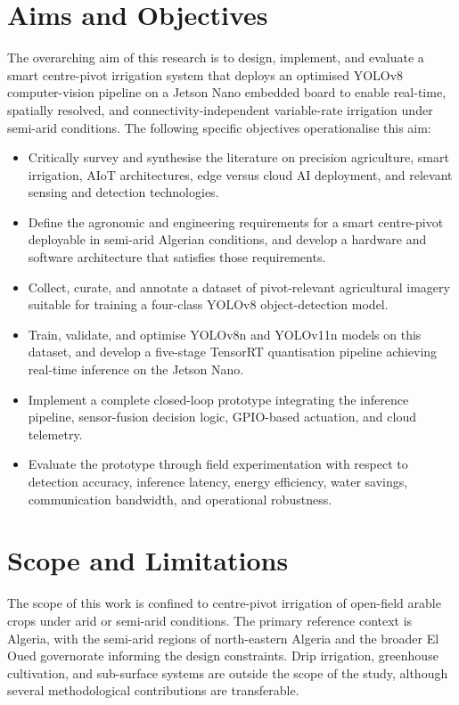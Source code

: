 \documentclass[12pt,a4paper]{report}
\begin{document}
\section{Aims and Objectives}

The overarching aim of this research is to design, implement, and evaluate a smart centre-pivot irrigation system that deploys an optimised YOLOv8 computer-vision pipeline on a Jetson Nano embedded board to enable real-time, spatially resolved, and connectivity-independent variable-rate irrigation under semi-arid conditions. The following specific objectives operationalise this aim:

\begin{itemize}
    \item[\textbf{O1.}] Critically survey and synthesise the literature on precision agriculture, smart irrigation, AIoT architectures, edge versus cloud AI deployment, and relevant sensing and detection technologies.
    \item[\textbf{O2.}] Define the agronomic and engineering requirements for a smart centre-pivot deployable in semi-arid Algerian conditions, and develop a hardware and software architecture that satisfies those requirements.
    \item[\textbf{O3.}] Collect, curate, and annotate a dataset of pivot-relevant agricultural imagery suitable for training a four-class YOLOv8 object-detection model.
    \item[\textbf{O4.}] Train, validate, and optimise YOLOv8n and YOLOv11n models on this dataset, and develop a five-stage TensorRT quantisation pipeline achieving real-time inference on the Jetson Nano.
    \item[\textbf{O5.}] Implement a complete closed-loop prototype integrating the inference pipeline, sensor-fusion decision logic, GPIO-based actuation, and cloud telemetry.
    \item[\textbf{O6.}] Evaluate the prototype through field experimentation with respect to detection accuracy, inference latency, energy efficiency, water savings, communication bandwidth, and operational robustness.
\end{itemize}

\section{Scope and Limitations}

The scope of this work is confined to centre-pivot irrigation of open-field arable crops under arid or semi-arid conditions. The primary reference context is Algeria, with the semi-arid regions of north-eastern Algeria and the broader El Oued governorate informing the design constraints. Drip irrigation, greenhouse cultivation, and sub-surface systems are outside the scope of the study, although several methodological contributions are transferable.
\end{document}
